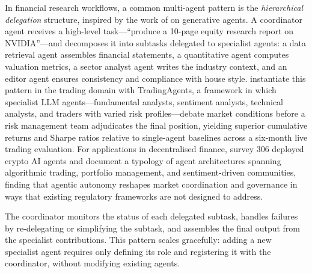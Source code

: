 \begin{deepdive}
In financial research workflows, a common multi-agent pattern is the
\emph{hierarchical delegation} structure, inspired by the work of
\citet{park2023generative} on generative agents. A coordinator agent receives a
high-level task---``produce a 10-page equity research report on NVIDIA''---and
decomposes it into subtasks delegated to specialist agents: a data retrieval agent
assembles financial statements, a quantitative agent computes valuation metrics, a
sector analyst agent writes the industry context, and an editor agent ensures
consistency and compliance with house style. \citet{xiao2024tradingagents} instantiate
this pattern in the trading domain with TradingAgents, a framework in which specialist
LLM agents---fundamental analysts, sentiment analysts, technical analysts, and traders
with varied risk profiles---debate market conditions before a risk management team
adjudicates the final position, yielding superior cumulative returns and Sharpe ratios
relative to single-agent baselines across a six-month live trading evaluation. For
applications in decentralised finance, \citet{ante2024autonomous} survey 306 deployed
crypto AI agents and document a typology of agent architectures spanning algorithmic
trading, portfolio management, and sentiment-driven communities, finding that agentic
autonomy reshapes market coordination and governance in ways that existing regulatory
frameworks are not designed to address.

The coordinator monitors the status of each delegated subtask, handles failures by
re-delegating or simplifying the subtask, and assembles the final output from the
specialist contributions. This pattern scales gracefully: adding a new specialist
agent requires only defining its role and registering it with the coordinator, without
modifying existing agents.


\end{deepdive}
